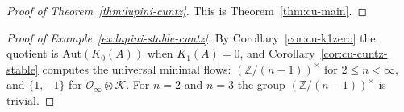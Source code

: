 \begin{proof}[Proof of Theorem~\ref{thm:lupini-cuntz}]
This is Theorem~\ref{thm:cu-main}.
\end{proof}

\begin{proof}[Proof of Example~\ref{ex:lupini-stable-cuntz}]
By Corollary~\ref{cor:cu-k1zero} the quotient is $\mathrm{Aut}(K_0(A))$ when
$K_1(A)=0$, and Corollary~\ref{cor:cu-cuntz-stable} computes the universal
minimal flows: $(\mathbb{Z}/(n-1))^\times$ for $2\leq n<\infty$, and
$\{1,-1\}$ for $\mathcal{O}_\infty\otimes\mathcal{K}$. For $n=2$ and $n=3$ the
group $(\mathbb{Z}/(n-1))^\times$ is trivial.
\end{proof}
